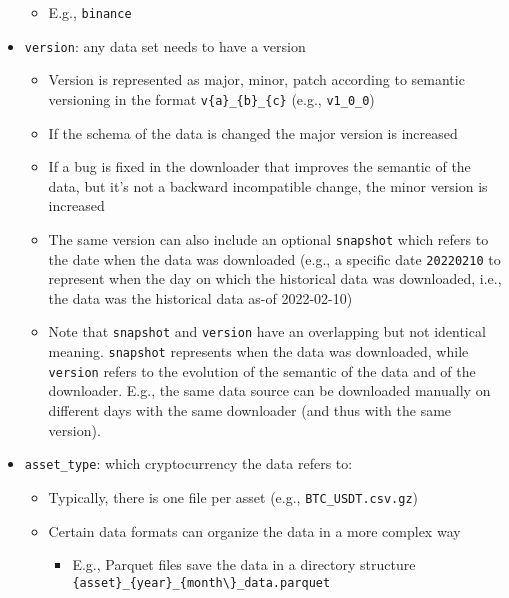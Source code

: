 \documentclass[11pt, reqno]{amsart}
\theoremstyle{definition}
\theoremstyle{remark}
\begin{document}
\begin{itemize}
        \begin{itemize}
          \item E.g., \verb|binance|
        \end{itemize}
  \item \verb|version|: any data set needs to have a version

        \begin{itemize}
          \item Version is represented as major, minor, patch according to semantic
                versioning in the format \verb|v{a}_{b}_{c}| (e.g.,
                \verb|v1_0_0|)
          \item If the schema of the data is changed the major version is increased
          \item If a bug is fixed in the downloader that improves the semantic of
                the data, but it's not a backward incompatible change, the minor
                version is increased
          \item The same version can also include an optional \verb|snapshot|
                which refers to the date when the data was downloaded (e.g., a
                specific date \verb|20220210| to represent when the day on which
                the historical data was downloaded, i.e., the data was the
                historical data as-of 2022-02-10)
          \item Note that \verb|snapshot| and \verb|version| have an overlapping
                but not identical meaning. \verb|snapshot| represents when the
                data was downloaded, while \verb|version| refers to the evolution
                of the semantic of the data and of the downloader. E.g., the same
                data source can be downloaded manually on different days with the
                same downloader (and thus with the same version).
        \end{itemize}
  \item \verb|asset_type|: which cryptocurrency the data refers to:

        \begin{itemize}
          \item Typically, there is one file per asset (e.g.,
                \verb|BTC_USDT.csv.gz|)
          \item Certain data formats can organize the data in a more complex way

                \begin{itemize}
                  \item E.g., Parquet files save the data in a directory structure
                        \verb|{asset}_{year}_{month\}_data.parquet|
                \end{itemize}
        \end{itemize}
\end{itemize}
\end{document}
